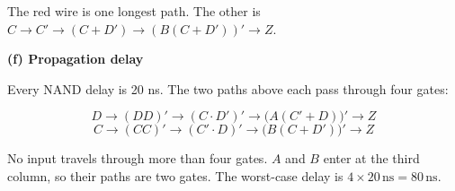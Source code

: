 \documentclass[10pt]{article}
\newcommand{\task}[1]{\par\vspace{2pt}\noindent\textbf{#1}\par\vspace{1pt}}
\begin{document}
The red wire is one longest path. The other is \(C \rightarrow C' \rightarrow (C + D') \rightarrow (B(C + D'))' \rightarrow Z\).

\task{(f) \quad Propagation delay}

Every NAND delay is 20 ns. The two paths above each pass through four gates:

\[
D \rightarrow (DD)' \rightarrow (C \cdot D')' \rightarrow \big(A(C'+D)\big)' \rightarrow Z
\]
\[
C \rightarrow (CC)' \rightarrow (C' \cdot D)' \rightarrow \big(B(C+D')\big)' \rightarrow Z
\]

No input travels through more than four gates. \(A\) and \(B\) enter at the third column, so their paths are two gates. The worst-case delay is \(4 \times 20\,\text{ns} = 80\,\text{ns}\).
\end{document}
